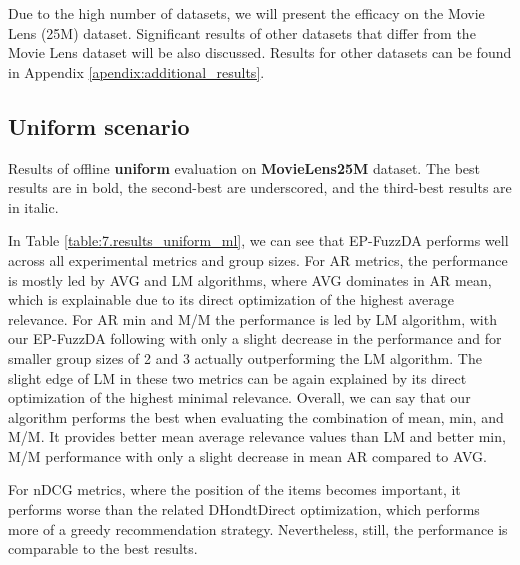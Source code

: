 Due to the high number of datasets, we will present the efficacy on the Movie Lens (25M) dataset. Significant results of other datasets that differ from the Movie Lens dataset will be also discussed. Results for other datasets can be found in Appendix \ref{apendix:additional_results}.

\subsection{Uniform scenario} \label{subsec:07_experiments.results.uniform}

\begin{table}[!htbp]
    \centering
    \scalebox{0.76}{\hspace*{-1.2cm}{
        
    }}\hspace*{-1.3cm}
    \caption[Results of offline uniform evaluation on Movie Lens dataset]{Results of offline \textbf{uniform} evaluation on \textbf{MovieLens25M} dataset. The best results are in bold, the second-best are underscored, and the third-best results are in italic.}
    \label{table:7.results_uniform_ml}
\end{table}


In Table \ref{table:7.results_uniform_ml}, we can see that EP-FuzzDA performs well across all experimental metrics and group sizes. For AR metrics, the performance is mostly led by AVG and LM algorithms, where AVG dominates in AR mean, which is explainable due to its direct optimization of the highest average relevance. For AR min and M/M the performance is led by LM algorithm, with our EP-FuzzDA following with only a slight decrease in the performance and for smaller group sizes of 2 and 3 actually outperforming the LM algorithm. The slight edge of LM in these two metrics can be again explained by its direct optimization of the highest minimal relevance. Overall, we can say that our algorithm performs the best when evaluating the combination of mean, min, and M/M. It provides better mean average relevance values than LM and better min, M/M performance with only a slight decrease in mean AR compared to AVG.

For nDCG metrics, where the position of the items becomes important, it performs worse than the related DHondtDirect optimization, which performs more of a greedy recommendation strategy. Nevertheless, still, the performance is comparable to the best results.

